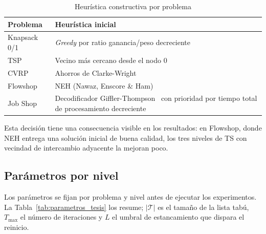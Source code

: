 \begin{table}[H]
\centering
\caption{Heurística constructiva por problema}
\label{tab:constructivas}
\small
\begin{tabular}{lp{9.2cm}}
\toprule
\textbf{Problema} & \textbf{Heurística inicial} \\
\midrule
Knapsack 0/1 & \emph{Greedy} por ratio ganancia/peso decreciente \\
TSP          & Vecino más cercano desde el nodo 0~\cite{johnson1997traveling} \\
CVRP         & Ahorros de Clarke-Wright~\cite{clarke1964scheduling} \\
Flowshop     & NEH (Nawaz, Enscore \& Ham)~\cite{nawaz1983heuristic} \\
Job Shop     & Decodificador Giffler-Thompson~\cite{giffler1960algorithms} con
               prioridad por tiempo total de procesamiento decreciente \\
\bottomrule
\end{tabular}
\end{table}

Esta decisión tiene una consecuencia visible en los resultados: en Flowshop,
donde NEH entrega una solución inicial de buena calidad, los tres niveles
de TS con vecindad de intercambio adyacente la mejoran poco.

\subsection{Parámetros por nivel}

Los parámetros se fijan por problema y nivel antes de ejecutar los
experimentos. La Tabla~\ref{tab:parametros_tesis} los resume; $|\mathcal{T}|$
es el tamaño de la lista tabú, $T_{\max}$ el número de iteraciones y $L$ el
umbral de estancamiento que dispara el reinicio.

